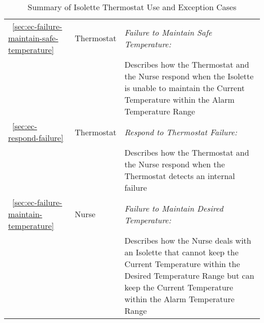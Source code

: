 \begin{table}
\begin{tabular}{|l|l|l|}
\hline
~\ref{sec:ec-failure-maintain-safe-temperature} & Thermostat & \emph{Failure to Maintain Safe Temperature:} \\
      &            & \hspace{3mm} 
                     \begin{minipage}[t]{11cm}
                       Describes how the Thermostat and the Nurse respond when the 
                       Isolette is unable to maintain the Current Temperature 
                       within the Alarm Temperature Range
                     \end{minipage}
\\[1em]
\hline
~\ref{sec:ec-respond-failure} & Thermostat & \emph{Respond to Thermostat Failure:} \\
      &            & \hspace{3mm} 
                     \begin{minipage}[t]{11cm}
                        Describes how the Thermostat and the 
                        Nurse respond when the Thermostat detects an 
                        internal failure
                     \end{minipage}                                                         
\\[1em]
\hline
~\ref{sec:ec-failure-maintain-temperature} & Nurse & \emph{Failure to Maintain Desired Temperature:} \\
      &            & \hspace{3mm} 
                     \begin{minipage}[t]{11cm}
                        Describes how the Nurse deals with an Isolette that 
                        cannot keep the Current Temperature within the Desired 
                        Temperature Range but can keep the Current Temperature 
                        within the Alarm Temperature Range
                     \end{minipage}
\\
\hline                   
\end{tabular}   
\caption{Summary of Isolette Thermostat Use and Exception Cases}
\label{tab:use-exception-cases}
\end{table}


